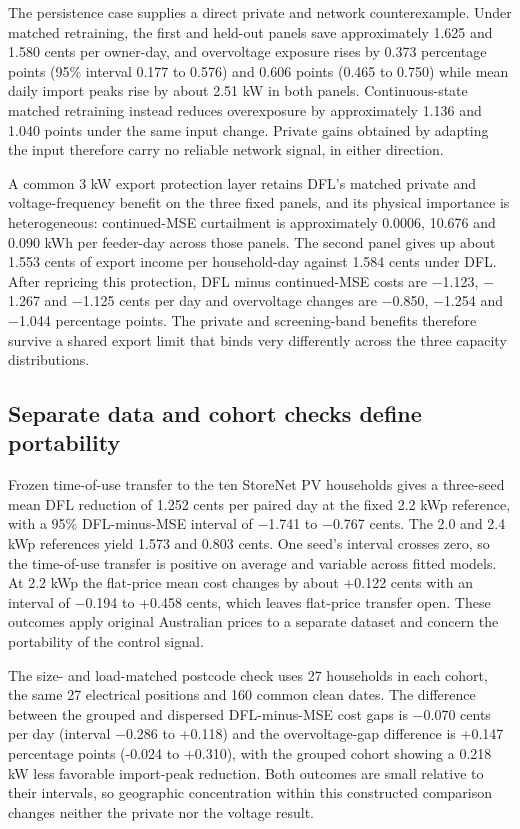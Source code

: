 \documentclass[pdflatex,Numbered,sn-basic]{sn-jnl}
\begin{document}
The persistence case supplies a direct private and network counterexample. Under matched retraining, the first and held-out panels save approximately 1.625 and 1.580 cents per owner-day, and overvoltage exposure rises by 0.373 percentage points (95\% interval 0.177 to 0.576) and 0.606 points (0.465 to 0.750) while mean daily import peaks rise by about 2.51 kW in both panels. Continuous-state matched retraining instead reduces overexposure by approximately 1.136 and 1.040 points under the same input change. Private gains obtained by adapting the input therefore carry no reliable network signal, in either direction.

A common 3 kW export protection layer retains DFL's matched private and voltage-frequency benefit on the three fixed panels, and its physical importance is heterogeneous: continued-MSE curtailment is approximately 0.0006, 10.676 and 0.090 kWh per feeder-day across those panels. The second panel gives up about 1.553 cents of export income per household-day against 1.584 cents under DFL. After repricing this protection, DFL minus continued-MSE costs are $-$1.123, $-$1.267 and $-$1.125 cents per day and overvoltage changes are $-$0.850, $-$1.254 and $-$1.044 percentage points. The private and screening-band benefits therefore survive a shared export limit that binds very differently across the three capacity distributions.

\subsection{Separate data and cohort checks define portability}

Frozen time-of-use transfer to the ten StoreNet PV households gives a three-seed mean DFL reduction of 1.252 cents per paired day at the fixed 2.2 kWp reference, with a 95\% DFL-minus-MSE interval of $-$1.741 to $-$0.767 cents. The 2.0 and 2.4 kWp references yield 1.573 and 0.803 cents. One seed's interval crosses zero, so the time-of-use transfer is positive on average and variable across fitted models. At 2.2 kWp the flat-price mean cost changes by about +0.122 cents with an interval of $-$0.194 to +0.458 cents, which leaves flat-price transfer open. These outcomes apply original Australian prices to a separate dataset and concern the portability of the control signal.

The size- and load-matched postcode check uses 27 households in each cohort, the same 27 electrical positions and 160 common clean dates. The difference between the grouped and dispersed DFL-minus-MSE cost gaps is $-$0.070 cents per day (interval $-$0.286 to +0.118) and the overvoltage-gap difference is +0.147 percentage points (-0.024 to +0.310), with the grouped cohort showing a 0.218 kW less favorable import-peak reduction. Both outcomes are small relative to their intervals, so geographic concentration within this constructed comparison changes neither the private nor the voltage result.
\end{document}
